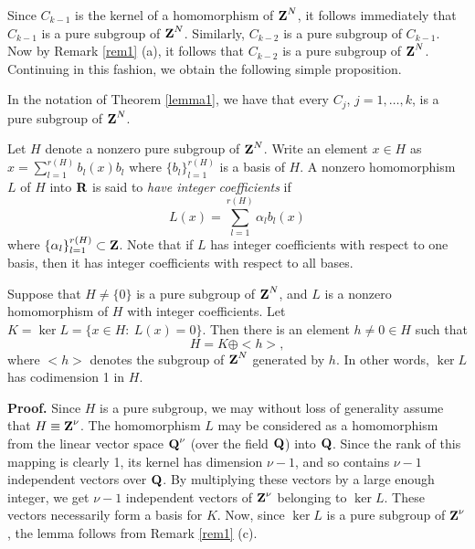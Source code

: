 Since $C_{k-1}$ is the kernel of a
homomorphism of $\Z^N$, it follows immediately that
$C_{k-1}$ is a pure subgroup of $\Z^N$.  Similarly,
$C_{k-2}$ is a pure
subgroup of $C_{k-1}$.  Now by Remark \ref{rem1} (a),
it follows that $C_{k-2}$ is a pure subgroup of $\Z^N$.
Continuing in this fashion, we obtain the following simple
proposition. 
\begin{pure}
In the notation of Theorem \ref{lemma1},
we have that every $C_j$, $j=1,\ldots,k$, is a
pure subgroup of $\Z^N$.
\label{pure}
\end{pure}
Let $H$ 
denote a nonzero pure subgroup of $\Z^N$.  
Write an element $x\in H$
as $x=\sum_{l=1}^{r(H)} b_l(x) b_l$ where 
$\{b_l\}_{l=1}^{r(H)}$ is a basis of $H$.  
A nonzero 
homomorphism $L$ of $H$ into $\R$ is said to {\em have 
integer coefficients} if 
$$L(x)=  \sum_{l=1}^{r(H)} \alpha_l b_l(x) $$
where $\{\alpha_l\}_{l=1}^{r(H)}\subset \Z$.  
Note that if $L$ has integer coefficients with respect to one basis,
then it has integer coefficients with respect to all bases.
\begin{lemma2}
Suppose that $H\neq \{0\}$ is a pure
subgroup of $\Z^N$, and $L$ is a
nonzero homomorphism of $H$ 
with integer coefficients.  
Let $K=\ker L=\{x\in H:\ L(x)=0\}$.  Then 
there is an element $h\neq 0 \in H$ such that 
$$H=K\oplus <h>,$$
where $<h>$ denotes the subgroup of $\Z^N$
generated by $h$.
In other words, $\ker L$ has codimension 1 in $H$.
\label{lemma2}
\end{lemma2}
{\bf Proof.}  Since $H$ is a pure
subgroup, we may without loss of generality assume that
$H\equiv \Z^\nu$.  The homomorphism $L$
may be considered as a homomorphism from the linear 
vector space $\Q^\nu$ (over the field $\Q$)
into $\Q$.  Since the rank of this mapping is
clearly 1, its kernel has dimension $\nu -1$,
and so contains $\nu -1$ independent vectors over
$\Q$.  By multiplying these vectors by
a large enough integer, we get $\nu -1$ independent vectors
of $\Z^\nu$ belonging to $\ker L$.  These vectors
necessarily form a basis for $K$.
Now, since 
$\ker L$ is a pure subgroup of 
$\Z^\nu$, the lemma follows from Remark \ref{rem1} (c).
\\


